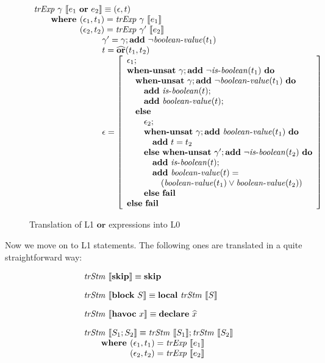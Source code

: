 \begin{figure}
\[
\begin{array}{l}
\trExp{\gamma}{\orE{e_1}{e_2}} \equiv (\epsilon, t)\\
\qquad \textbf{where }(\epsilon_1, t_1) = \trExp{\gamma}{e_1}\\
\qquad \phantom{\textbf{where }}(\epsilon_2, t_2) = \trExp{\gamma'}{e_2}\\
\qquad\qquad\qquad\qquad \gamma' = \gamma;\addE~\neg\booleanvalue{t_1}\\
\qquad\qquad\qquad\qquad t = \widehat{\mathbf{or}}(t_1, t_2)\\
\qquad\qquad\qquad\qquad \epsilon = \left[ 
\begin{array}{l}
\epsilon_1;\\
\whenUnsatW~\gamma;\addE~\neg\isboolean{t_1}~\doW\\
\quad\whenUnsatW~\gamma;\addE~\neg\booleanvalue{t_1}~\doW\\
\quad\quad\addE~\isboolean{t};\\
\quad\quad\addE~\booleanvalue{t};\\
\quad\elseW\\
\quad\quad\epsilon_2;\\
\quad\quad\whenUnsatW~\gamma;\addE~\booleanvalue{t_1}~\doW\\
\quad\quad\quad\addE~t = t_2\\
\quad\quad\elseW~\whenUnsatW~\gamma';\addE~\neg\isboolean{t_2}~\doW\\
\quad\quad\quad\addE~\isboolean{t};\\
\quad\quad\quad\addE~\booleanvalue{t} = \\
\quad\quad\quad\quad(\booleanvalue{t_1} \lor \booleanvalue{t_2})\\
\quad\quad\elseW~\failE\\
\elseW~\failE
\end{array}
\right] \\
\end{array}
\]
\caption{Translation of L1 $\mathbf{or}$ expressions into L0}
\label{fig:ortr}
\end{figure}

Now we move on to L1 statements. The following ones are translated in a 
quite straightforward way:

\[
\begin{array}{l}
\trStm{\skipE} \equiv \skipE\\[1em]
\trStm{\blockE~S} \equiv \localE~\trStm{S}\\[1em]
\trStm{\havocE~x} \equiv \declareE{\widehat{x}}\\[1em]
\trStm{S_1;S_2} \equiv \trStm{S_1};\trStm{S_2}\\
\qquad \textbf{where }(\epsilon_1, t_1) = \trExps{e_1}\\
\qquad \phantom{\textbf{where }}(\epsilon_2, t_2) = \trExps{e_2}
\end{array}
\]

